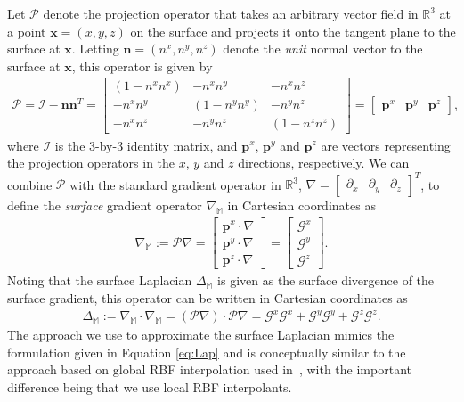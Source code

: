 \documentclass[smallextended]{svjour3}
\newcommand{\calP}{{ \mathcal P}}
\newcommand{\calI}{{ \mathcal I}}
\def\calG{{ \mathcal G}}
\newcommand{\vX}{ \mathbf{x} }
\newcommand{\unrml}{\mathbf{n}}
\newcommand{\calp}{\mathbf{p}}
\begin{document}
Let $\calP$ denote the projection operator that takes an arbitrary vector field in $\mathbb{R}^3$ at a point
$\vX=(x,y,z)$ on the surface and projects it onto the tangent
plane to the surface at $\vX$.  Letting $\unrml=(n^x,n^y, n^z)$ denote
the \emph{unit} normal vector to the surface at $\vX$, this
operator is given by
%
\begin{align}
\calP = \calI - \unrml\unrml^{T} =
\begin{bmatrix}
(1 - n^x n^x) & -n^x n^y & -n^x n^z  \\
-n^x n^y & (1 - n^y n^y) & -n^y n^z \\
-n^x n^z & -n^y n^z & (1-n^z n^z) 
\end{bmatrix} =
\begin{bmatrix}
\calp^x & 
\calp^y &
\calp^z 
\end{bmatrix},
\label{eq:proj_mat}
\end{align}
%
where $\calI$ is the $3$-by-$3$ identity matrix, and $\calp^x$, $\calp^y$ and $\calp^z$
are vectors representing the projection operators in the $x$, $y$ and $z$
directions, respectively.  We can combine $\calP$ with the standard
gradient operator in $\mathbb{R}^3$, $\nabla
= \begin{bmatrix} \partial_x & \partial_y & \partial_z \end{bmatrix}^T$, to define
the \emph{surface} gradient operator $\nabla_{\mathbb{M}}$ in Cartesian
coordinates as
%
\begin{align}
\nabla_{\mathbb{M}} := \calP\nabla = \begin{bmatrix} \calp^x \cdot \nabla \\ \calp^y \cdot \nabla \\ \calp^z \cdot \nabla \end{bmatrix} = \begin{bmatrix} \calG^x \\ \calG^y \\ \calG^z \end{bmatrix}.
\label{eq:grad}
\end{align}
%
Noting that the surface Laplacian $\Delta_{\mathbb{M}}$ is given as the surface divergence of the surface gradient, this operator can be written in Cartesian coordinates as
%
\begin{align}
\Delta_{\mathbb{M}}:= \nabla_{\mathbb{M}}\cdot \nabla_{\mathbb{M}} = (\calP\nabla) \cdot \calP\nabla = \calG^x \calG^x + \calG^y \calG^y + \calG^z \calG^z.
\label{eq:Lap}
\end{align}
%
The approach we use to approximate the surface Laplacian mimics the
formulation given in Equation \eqref{eq:Lap} and is conceptually similar to
the approach based on global RBF interpolation used in~\cite{FuselierWright2012}, with the important difference being that we use local RBF interpolants.
\end{document}
